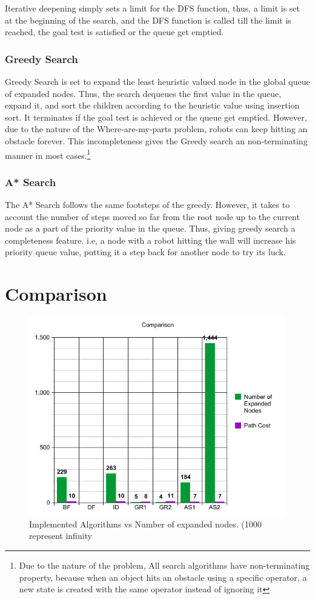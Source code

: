 Iterative deepening simply sets a limit for the DFS function, thus, a limit is set at the beginning of the search, and the DFS function is called till the limit is reached, the goal test is satisfied or the queue get emptied.

\subsubsection{Greedy Search}
Greedy Search is set to expand the least heuristic valued node in the global queue of expanded nodes. Thus, the search dequeues the first value in the queue, expand it, and sort the children according to the heuristic value using insertion sort. It terminates if the goal test is achieved or the queue get emptied. However, due to the nature of the Where-are-my-parts problem, robots can keep hitting an obstacle forever. This incompleteness gives the Greedy search an non-terminating manner in most cases.\footnote{Due to the nature of the problem, All search algorithms have non-terminating property, because when an object hits an obstacle using a specific operator, a new state is created with the same operator instead of ignoring it}

\subsubsection{A* Search}
The A* Search follows the same footsteps of the greedy. However, it takes to account the number of steps moved so far from the root node up to the current node as a part of the priority value in the queue. Thus, giving greedy search a completeness feature. i.e, a node with a robot hitting the wall will increase his priority queue value, putting it a step back for another node to try its luck.

\newpage
\section{Comparison}
\begin{figure}[H] 
   	\centering
	\includegraphics[scale=0.6]{images/Graph} 
    \caption{Implemented Algorithms vs Number of expanded nodes. (1000 represent infinity}
    \label{fig:graph} 
\end{figure}

